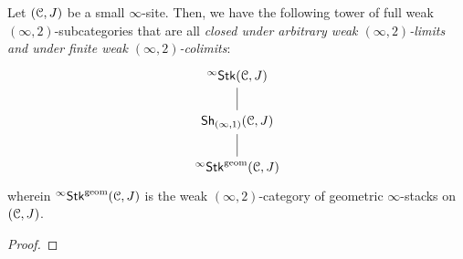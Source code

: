                 \begin{lemma} \label{lemma: derived_geometric_stack_categories}
                    Let $(\mathcal{C}, J)$ be a small $\infty$-site. Then, we have the following tower of full weak $(\infty, 2)$-subcategories that are all \textit{closed under arbitrary weak $(\infty, 2)$-limits and under finite weak $(\infty, 2)$-colimits}:
                        $$
                            \begin{tikzcd}
                            	{{}^{\infty}\Stk(\C, J)} \\
                            	{\Sh_{(\infty,1)}(\C, J)} \\
                            	{{}^{\infty}\Stk^{\geom}(\C, J)}
                            	\arrow[no head, from=3-1, to=2-1]
                            	\arrow[no head, from=2-1, to=1-1]
                            \end{tikzcd}
                        $$
                    wherein ${}^{\infty}\mathsf{Stk}^{\mathrm{geom}}(\mathcal{C}, J)$ is the weak $(\infty, 2)$-category of geometric $\infty$-stacks on $(\mathcal{C}, J)$.
                \end{lemma}
                    \begin{proof}
                        
                    \end{proof}
                
